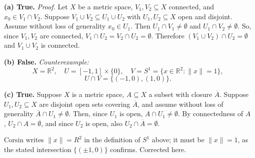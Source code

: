 \begin{exercisesolution}
\textbf{(a) True.} \textit{Proof.} Let $X$ be a metric space, $V_1, V_2 \subseteq X$ connected,
and $x_0 \in V_1 \cap V_2$. Suppose $V_1 \cup V_2 \subseteq U_1 \cup U_2$ with
$U_1, U_2 \subseteq X$ open and disjoint. Assume without loss of generality $x_0 \in U_1$. Then
$U_1 \cap V_1 \neq \emptyset$ and $U_1 \cap V_2 \neq \emptyset$. So, since $V_1, V_2$ are
connected, $V_1 \cap U_2 = V_2 \cap U_2 = \emptyset$. Therefore
$(V_1 \cup V_2) \cap U_2 = \emptyset$ and $V_1 \cup V_2$ is connected.

\textbf{(b) False.} \textit{Counterexample:}
\[
X = \mathbb{R}^2, \quad U = [-1,1] \times \{0\}, \quad V = S^1 = \{x \in \mathbb{R}^2 : \|x\| = 1\},
\]
\[
U \cap V = \{(-1,0), (1,0)\}.
\]

\textbf{(c) True.} Suppose $X$ is a metric space, $A \subseteq X$ a subset with closure
$\overline{A}$. Suppose $U_1, U_2 \subseteq X$ are disjoint open sets covering $\overline{A}$, and
assume without loss of generality $\overline{A} \cap U_1 \neq \emptyset$. Then, since $U_1$ is
open, $A \cap U_1 \neq \emptyset$. By connectedness of $A$, $U_2 \cap A = \emptyset$, and since
$U_2$ is open, also $U_2 \cap \overline{A} = \emptyset$.
\end{exercisesolution}

\begin{ainote}
Corsin writes $\|x\| = R^2$ in the definition of $S^1$ above; it must be $\|x\| = 1$, as the
stated intersection $\{(\pm 1, 0)\}$ confirms. Corrected here.
\end{ainote}

\begin{center}
\end{center}

